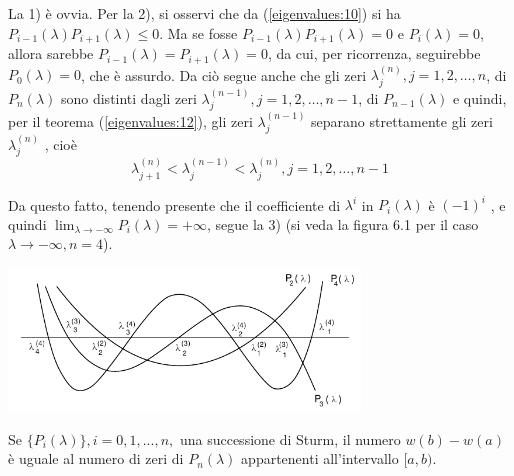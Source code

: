 \begin{thproof}
 La 1) \`e ovvia. Per la 2), si osservi che da
(\ref{eigenvalues:10}) si ha $P_{i−1} (\lambda)P_{i+1}(\lambda) \leq 0$.
Ma se fosse $P_{i−1} (\lambda)P_{i+1} (\lambda) = 0 $ e $P_i (\lambda)
= 0$, allora sarebbe $P_{i−1} (\lambda) = P_{i+1} (\lambda) = 0$, da
cui, per ricorrenza, seguirebbe $P_0 (\lambda) = 0$, che \`e assurdo.
Da ci\`o segue anche che gli zeri $\lambda_j^{(n)} , j = 1, 2, \ldots , n$,
 di $P_n (\lambda)$ sono distinti dagli zeri
$\lambda_j^{(n-1)}, j = 1, 2, \ldots , n - 1$, di $P_{n−1} (\lambda)$ e quindi,
 per il teorema (\ref{eigenvalues:12}), gli zeri $\lambda_j^{(n-1)}$ separano
strettamente gli zeri $\lambda_j^{(n)}$ , cio\`e
$$
\lambda_{j+1}^{(n)} < \lambda_{j}^{(n-1)} < \lambda_{j}^{(n)},
j=1,2,\ldots,n-1
$$

Da questo fatto, tenendo presente che il coefficiente di
$\lambda^i$ in $P_i(\lambda)$ \`e $(−1)^i$ ,
e quindi $\displaystyle \lim_{\lambda \to - \infty}P_i(\lambda) = +\infty$,
segue la 3) (si veda la figura 6.1 per il caso
$\lambda \to -\infty,n = 4$).
\begin{center}
\includegraphics[width=0.7\textwidth]{imgs/grafico01.png}
\end{center}
\end{thproof}

\begin{theo}[Sturm]
Se $\{P_i (\lambda)\}, i = 0, 1, . . . , n,$  una successione di Sturm,
il numero $w(b) − w(a)$ \`e uguale al numero di zeri di $P_n (\lambda)$
 appartenenti all’intervallo $[a, b)$.
\end{theo}

